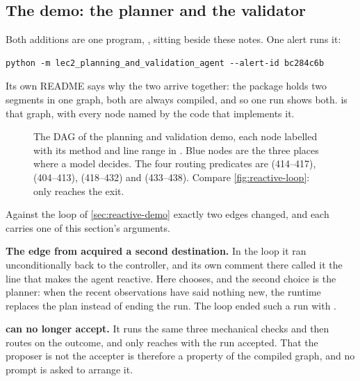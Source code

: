 \subsection{The demo: the planner and the validator}
\label{sec:planning-demo}
\label{sec:validation-demo}

Both additions are one program, , sitting
beside these notes. One alert runs it:

\begin{lstlisting}[basicstyle=\ttfamily\scriptsize, frame=none]
python -m lec2_planning_and_validation_agent --alert-id bc284c6b
\end{lstlisting}

\noindent Its own README says why the two arrive together: the package holds two segments in one
graph, both are always compiled, and so one run shows both.  is that
graph, with every node named by the code that implements it.

\begin{figure}[htbp]
  \centering
  \resizebox{\linewidth}{!}{}
  \caption{The DAG of the planning and validation demo, each node labelled with its method and line
  range in . Blue nodes are the three places where a model decides. The four
  routing predicates are  (414--417),  (404--413),
   (418--432) and  (433--438). Compare
  \cref{fig:reactive-loop}: only  reaches the exit.}
  \label{fig:graph-plan-validate}
\end{figure}

Against the loop of \cref{sec:reactive-demo} exactly two edges changed, and each carries one of
this section's arguments.

\bi

\item \textbf{The edge from  acquired a second destination.} In the loop it ran
unconditionally back to the controller, and its own comment there called it the line that makes the
agent reactive. Here  chooses, and the second choice is the planner: when the
recent observations have said nothing new, the runtime replaces the plan instead of ending the run.
The loop ended such a run with .

\item \textbf{ can no longer accept.} It runs the same three mechanical checks and
then routes on the outcome, and only  reaches  with the run accepted.
That the proposer is not the accepter is therefore a property of the compiled graph, and no prompt
is asked to arrange it.

